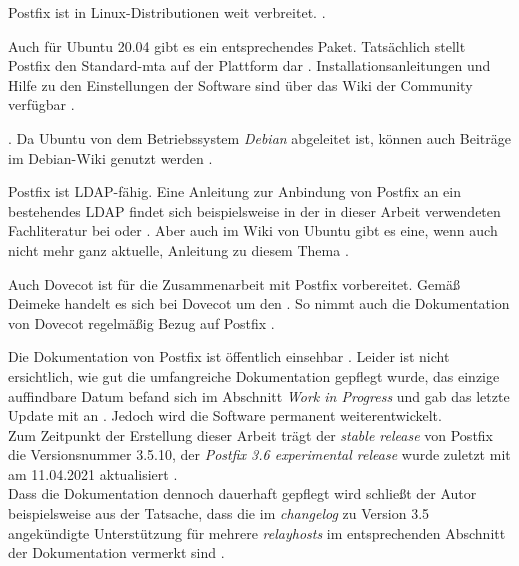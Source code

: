 Postfix ist in Linux-Distributionen weit verbreitet.  \citep[][53]{Heinlein2004}.

Auch für Ubuntu 20.04 gibt es ein entsprechendes Paket. Tatsächlich stellt Postfix den Standard-\ac{mta} auf der Plattform dar \citep[vgl.][]{ubuntupostfix}.
Installationsanleitungen und Hilfe zu den Einstellungen der Software sind über das Wiki der Community verfügbar \citep[vgl.][]{ubuntupostfixwiki}. 

 \citep[][]{ubuntupostfix}. Da Ubuntu von dem Betriebssystem \textit{Debian} abgeleitet ist, können auch Beiträge im Debian-Wiki genutzt werden \citep[vgl.][]{debianpostfix}. 

Postfix ist LDAP-fähig.
Eine Anleitung zur Anbindung von Postfix an ein bestehendes LDAP findet sich beispielsweise in der in dieser Arbeit verwendeten Fachliteratur bei \cite[S. 689 ff.]{Deimeke2019} oder \cite[S. 106 f.]{Heinlein2004}. Aber auch im Wiki von Ubuntu gibt es eine, wenn auch nicht mehr ganz aktuelle, Anleitung zu diesem Thema \citep[vgl.][]{ubuntudovecotLDAPwiki}.

Auch Dovecot ist für die Zusammenarbeit mit Postfix vorbereitet. 
Gemäß Deimeke handelt es sich bei Dovecot um den  \citep[][338]{Deimeke2019}. 
So nimmt auch die Dokumentation von Dovecot regelmäßig Bezug auf Postfix \citep[vgl. z.B.][]{DovecotPostfix}.

Die Dokumentation von Postfix ist öffentlich einsehbar \citep[vgl.][]{postfixdoku}. Leider ist nicht ersichtlich, wie gut die umfangreiche Dokumentation gepflegt wurde, das einzige auffindbare Datum befand sich im Abschnitt \textit{Work in Progress} und gab das letzte Update mit  an \citep[vgl.][]{postfixwip}. Jedoch wird die Software permanent weiterentwickelt. \\
Zum Zeitpunkt der Erstellung dieser Arbeit trägt der \textit{stable release} von Postfix die Versionsnummer 3.5.10, der \textit{Postfix 3.6 experimental release} wurde zuletzt mit am 11.04.2021 aktualisiert \citep[vgl.][]{postfixsource}. \\
Dass die Dokumentation dennoch dauerhaft gepflegt wird schließt der Autor beispielsweise aus der Tatsache, dass die im \textit{changelog} zu Version 3.5 angekündigte Unterstützung für mehrere \textit{relayhosts} \citep[vgl.][]{postfixcl35} im entsprechenden Abschnitt der Dokumentation vermerkt sind \citep[vgl.][]{postfixrelayhost}.

